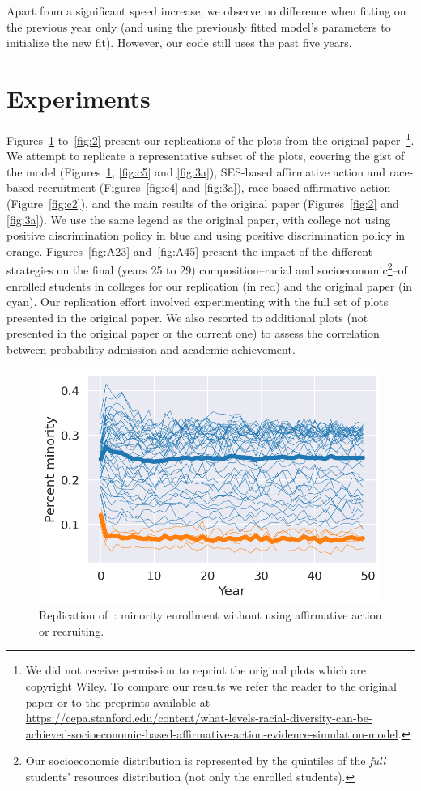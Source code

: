 Apart from a significant speed increase, we observe no difference when fitting on the previous year only (and using the previously fitted model's parameters to initialize the new fit). 
However, our code still uses the past five years.

\section{Experiments}

Figures~\ref{fig:c1} to~\ref{fig:2} present our replications of the plots from the original  paper~\cite{reardon2018levels}\footnote{We did not receive permission to reprint the original plots which are copyright Wiley. To compare our results we refer the reader to the original paper or to the preprints available at \url{https://cepa.stanford.edu/content/what-levels-racial-diversity-can-be-achieved-socioeconomic-based-affirmative-action-evidence-simulation-model}. }.
We attempt to replicate a representative subset of the plots, covering the gist of the model (Figures~\ref{fig:c1}, \ref{fig:c5} and \ref{fig:3a}), SES-based affirmative action and race-based recruitment (Figures~\ref{fig:c4} and \ref{fig:3a}), race-based affirmative action (Figure~\ref{fig:c2}), and the main results of the original paper (Figures~\ref{fig:2}  and \ref{fig:3a}). We use the same legend as the original paper, with college not using positive discrimination policy in \colorbox{sns-blue}{blue} and using positive discrimination policy in \colorbox{sns-orange}{orange}.
Figures~\ref{fig:A23} and~\ref{fig:A45} present the impact of the different strategies on the final (years 25 to 29) composition--racial and socioeconomic\footnote{Our socioeconomic distribution is represented by the quintiles of the \emph{full} students' resources distribution (not only the enrolled students).}--of enrolled students in colleges for our replication (in \colorbox{sns-red}{red}) and the original paper (in \colorbox{sns-cyan}{cyan}).
Our replication effort involved experimenting with the full set of plots presented in the original paper. 
We also resorted to additional plots (not presented in the original paper or the current one) to assess the correlation between probability admission and academic achievement.

\begin{figure}
  \centering
  \includegraphics[width=.75\linewidth]{figures/figC1.png}
  \caption{Replication of~\cite[Figure~C1, p.~41]{reardon2018levels}: minority enrollment without using affirmative action or recruiting.}
  \label{fig:c1}
\end{figure}

